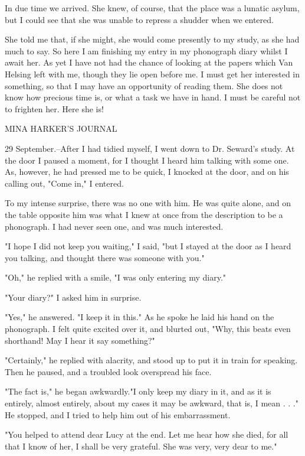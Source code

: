 In due time we arrived. She knew, of course, that the place was a lunatic asylum, but I could see that she was unable to repress a shudder when we entered. 

She told me that, if she might, she would come presently to my study, as she had much to say. So here I am finishing my entry in my phonograph diary whilst I await her. As yet I have not had the chance of looking at the papers which Van Helsing left with me, though they lie open before me. I must get her interested in something, so that I may have an opportunity of reading them. She does not know how precious time is, or what a task we have in hand. I must be careful not to frighten her. Here she is! 

MINA HARKER'S JOURNAL 

29 September.--After I had tidied myself, I went down to Dr. Seward's study. At the door I paused a moment, for I thought I heard him talking with some one. As, however, he had pressed me to be quick, I knocked at the door, and on his calling out, "Come in," I entered. 

To my intense surprise, there was no one with him. He was quite alone, and on the table opposite him was what I knew at once from the description to be a phonograph. I had never seen one, and was much interested. 

"I hope I did not keep you waiting," I said, "but I stayed at the door as I heard you talking, and thought there was someone with you." 

"Oh," he replied with a smile, "I was only entering my diary." 

"Your diary?" I asked him in surprise. 

"Yes," he answered. "I keep it in this." As he spoke he laid his hand on the phonograph. I felt quite excited over it, and blurted out, "Why, this beats even shorthand! May I hear it say something?" 

"Certainly," he replied with alacrity, and stood up to put it in train for speaking. Then he paused, and a troubled look overspread his face. 

"The fact is," he began awkwardly."I only keep my diary in it, and as it is entirely, almost entirely, about my cases it may be awkward, that is, I mean . . ." He stopped, and I tried to help him out of his embarrassment. 

"You helped to attend dear Lucy at the end. Let me hear how she died, for all that I know of her, I shall be very grateful. She was very, very dear to me." 

